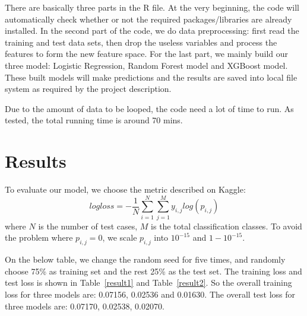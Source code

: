 \documentclass[12pt]{article}
\begin{document}
There are basically three parts in the R file. At the very beginning, the code will automatically check whether or not the required packages/libraries are already installed. In the second part of the code, we do data preprocessing: first read the training and test data sets, then drop the useless variables and process the features to form the new feature space. For the last part, we mainly build our three model: Logistic Regression, Random Forest model and XGBoost model. These built models will make predictions and the results are saved into local file system as required by the project description.

Due to the amount of data to be looped, the code need a lot of time to run. As tested, the total running time is around 70 mins.

\section{Results}

\quad To evaluate our model, we choose the metric described on Kaggle:
\begin{equation}
logloss = - \frac{1}{N} \sum_{i=1}^N \sum_{j=1}^M y_{i, j} log(p_{i, j})
\end{equation}
where $N$ is the number of test cases, $M$ is the total classification classes. To avoid the problem where $p_{i, j} = 0$, we scale $p_{i, j}$ into $10 ^ {-15}$ and $1 - 10 ^ {-15}$.

On the below table, we change the random seed for five times, and randomly choose 75\% as training set and the rest 25\% as the test set. The training loss and test loss is shown in Table~\ref{result1} and Table~\ref{result2}. So the overall training loss for three models are: 0.07156, 0.02536 and 0.01630. The overall test loss for three models are: 0.07170, 0.02538, 0.02070.
\end{document}
